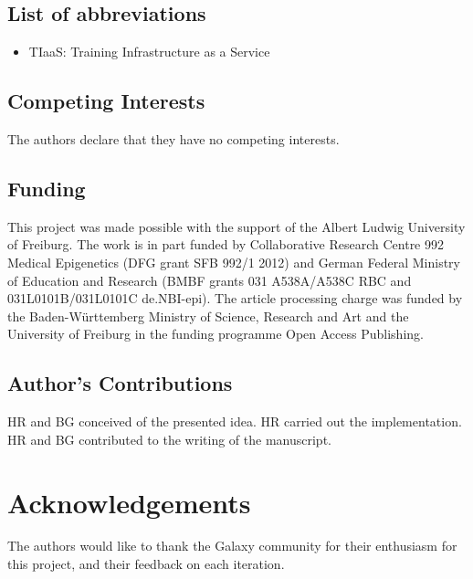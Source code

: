 \documentclass[a4paper,num-refs]{oup-contemporary}
\begin{document}
\subsection{List of abbreviations}
\begin{itemize}
\item TIaaS: Training Infrastructure as a Service
\end{itemize}


\subsection{Competing Interests}
The authors declare that they have no competing interests.

\subsection{Funding}
This project was made possible with the support of the Albert Ludwig University of Freiburg.
The work is in part funded by Collaborative Research Centre 992 Medical Epigenetics (DFG grant SFB 992/1 2012) and German Federal Ministry of Education and Research (BMBF grants 031 A538A/A538C RBC and 031L0101B/031L0101C de.NBI-epi). The article processing charge was funded by the Baden-Württemberg Ministry of Science, Research and Art and the University of Freiburg in the funding programme Open Access Publishing.

\subsection{Author's Contributions}
HR and BG conceived of the presented idea. HR carried out the implementation. HR and BG contributed to the writing of the manuscript.

\section{Acknowledgements}
The authors would like to thank the Galaxy community for their enthusiasm for this project, and their feedback on each iteration.


\end{document}
